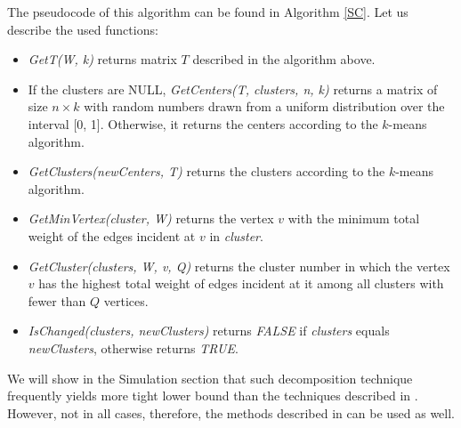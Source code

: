 \documentclass[runningheads]{llncs}
\begin{document}
The pseudocode of this algorithm can be found in Algorithm \ref{SC}. Let us describe the used functions:
\begin{itemize}[itemsep=1em]
    \item \textit{GetT(W, k)} returns matrix $T$ described in the algorithm above.
    \item If the clusters are NULL, \textit{GetCenters(T, clusters, n, k)} returns a matrix of size $n \times k$ with random numbers drawn from a uniform distribution over the interval [0, 1]. Otherwise, it returns the centers according to the $k$-means algorithm.
    \item \textit{GetClusters(newCenters, T)} returns the clusters according to the $k$-means algorithm.
    \item \textit {GetMinVertex(cluster, W)} returns the vertex $v$ with the minimum total weight of the edges incident at $v$ in \textit{cluster}.
    \item \textit {GetCluster(clusters, W, v, Q)} returns the cluster number in which the vertex $v$ has the highest total weight of edges incident at it among all clusters with fewer than $Q$ vertices.
    \item \textit{IsChanged(clusters, newClusters)} returns \textit{FALSE} if \textit{clusters} equals \textit{newClusters}, otherwise returns \textit{TRUE}.
\end{itemize}

We will show in the Simulation section that such decomposition technique frequently yields more tight lower bound than the techniques described in \cite{Erzin:24}. However, not in all cases, therefore, the methods described in \cite{Erzin:24} can be used as well.
\end{document}
